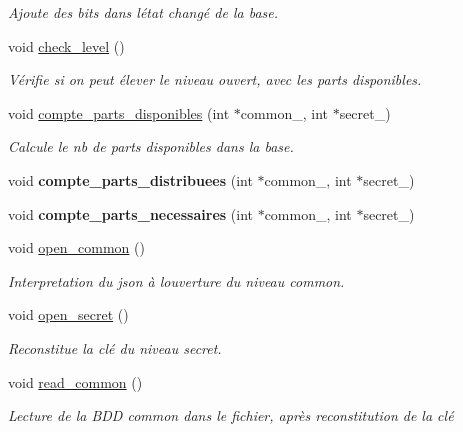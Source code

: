 \begin{DoxyCompactItemize}
\begin{DoxyCompactList}\small\item\em Ajoute des bits dans l\textquotesingle{}état changé de la base. \end{DoxyCompactList}\item 
void \hyperlink{classt__database_aff1abd122b7ea2dedf36eff44d75f0ef}{check\+\_\+level} ()
\begin{DoxyCompactList}\small\item\em Vérifie si on peut élever le niveau ouvert, avec les parts disponibles. \end{DoxyCompactList}\item 
void \hyperlink{classt__database_a9390c70f9abc03a7174ca19941573632}{compte\+\_\+parts\+\_\+disponibles} (int $\ast$common\+\_\+, int $\ast$secret\+\_\+)
\begin{DoxyCompactList}\small\item\em Calcule le nb de parts disponibles dans la base. \end{DoxyCompactList}\item 
\mbox{\label{classt__database_ad9daeb08ebf4ff0a2e269ee6b0cdf0bd}} 
void {\bfseries compte\+\_\+parts\+\_\+distribuees} (int $\ast$common\+\_\+, int $\ast$secret\+\_\+)
\item 
\mbox{\label{classt__database_ae1c36dea08c2ada6d155577792220ce9}} 
void {\bfseries compte\+\_\+parts\+\_\+necessaires} (int $\ast$common\+\_\+, int $\ast$secret\+\_\+)
\item 
void \hyperlink{classt__database_a22b32d446f8e07101c81354517502467}{open\+\_\+common} ()
\begin{DoxyCompactList}\small\item\em Interpretation du json à l\textquotesingle{}ouverture du niveau \textquotesingle{}common\textquotesingle{}. \end{DoxyCompactList}\item 
void \hyperlink{classt__database_ab0fd87c39625de20aa554a982fa00fa4}{open\+\_\+secret} ()
\begin{DoxyCompactList}\small\item\em Reconstitue la clé du niveau secret. \end{DoxyCompactList}\item 
void \hyperlink{classt__database_a63cf67dc2e635cec8d4ec4c023d0350a}{read\+\_\+common} ()
\begin{DoxyCompactList}\small\item\em Lecture de la B\+DD common dans le fichier, après reconstitution de la clé \end{DoxyCompactList}\item 

\end{DoxyCompactItemize}
